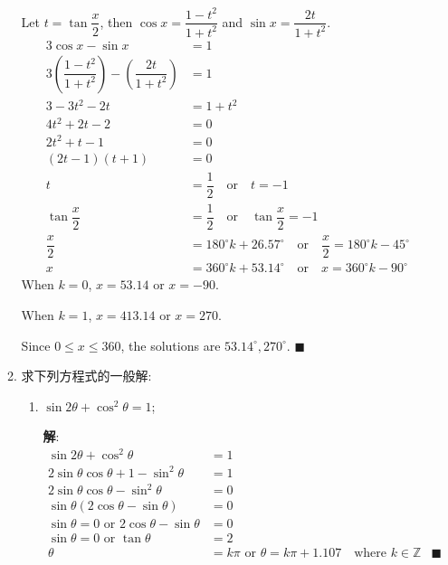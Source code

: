 \documentclass{report}
\newcommand{\sol}{\vspace{0.2cm}\textbf{解}:}
\begin{document}
\begin{enumerate}[leftmargin=*]
\begin{enumerate}
            Let $t = \tan\dfrac{x}{2}$, then $\cos x = \dfrac{1-t^2}{1+t^2}$ and $\sin x = \dfrac{2t}{1+t^2}$.
            \begin{align*}
                3 \cos x - \sin x &= 1\\
                3 \left(\dfrac{1-t^2}{1+t^2}\right) - \left(\dfrac{2t}{1+t^2}\right) &= 1\\
                3 - 3t^2 - 2t &= 1 + t^2\\
                4t^2 + 2t - 2 &= 0\\
                2t^2 + t - 1 &= 0\\
                (2t - 1)(t + 1) &= 0\\
                t &= \dfrac{1}{2} \quad \text{or} \quad t = -1\\
                \tan\dfrac{x}{2} &= \dfrac{1}{2} \quad \text{or} \quad \tan\dfrac{x}{2} = -1\\
                \dfrac{x}{2} &= 180^{\circ}k + 26.57^{\circ} \quad \text{or} \quad \dfrac{x}{2} = 180^{\circ}k - 45^{\circ}\\
                x &= 360^{\circ}k + 53.14^{\circ} \quad \text{or} \quad x = 360^{\circ}k - 90^{\circ}
            \end{align*}
            When $k = 0$, $x = 53.14$ or $x = -90$.

            When $k = 1$, $x = 413.14$ or $x = 270$.

            Since $0 \leq x \leq 360$, the solutions are $53.14^{\circ}, 270^{\circ}$. \hfill $\blacksquare$
        
            \newpage
            \item 求下列方程式的一般解:
            
            \begin{enumerate}
                \item $\sin 2 \theta+\cos ^2 \theta=1$;
                
                \sol{}
                \begin{align*}
                    \sin 2 \theta + \cos^2 \theta &= 1\\
                    2\sin\theta\cos\theta + 1 - \sin^2\theta &= 1\\
                    2\sin\theta\cos\theta - \sin^2\theta &= 0\\
                    \sin\theta(2\cos\theta - \sin\theta) &= 0\\
                    \sin\theta = 0 \text{ or } 2\cos\theta - \sin\theta &= 0\\
                    \sin\theta = 0 \text{ or } \tan\theta &= 2\\
                    \theta &= k\pi \text{ or } \theta = k\pi + 1.107 \quad \text{where } k \in \mathbb{Z} & \blacksquare
                \end{align*}
        

\end{enumerate}
\end{enumerate}
\end{enumerate}
\end{document}
